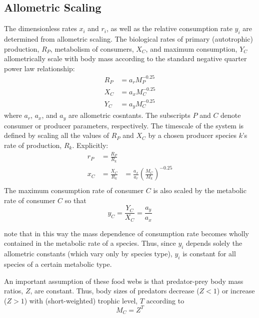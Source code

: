 \documentclass[11pt]{amsart}
\begin{document}
\subsection{Allometric Scaling}
The dimensionless rates $x_i$ and $r_i$, as well as the relative consumption rate $y_i$ are determined from allometric scaling.  The biological rates of primary (autotrophic) production, $R_P$, metabolism of consumers, $X_C$, and maximum consumption, $Y_C$ allometrically scale with body mass according to the standard negative quarter power law relationship:
\begin{align*}
R_P &= a_rM_P^{-0.25}\\
X_C &= a_xM_C^{-0.25}\\
Y_C &= a_yM_C^{-0.25}
\end{align*}
where $a_r$, $a_x$, and $a_y$ are allometric cosntants.  The subscripts $P$ and $C$ denote consumer or producer parameters, respectively.  The timescale of the system is defined by scaling all the values of $R_P$ and $X_C$ by a chosen producer species $k$'s rate of production, $R_k$.  Explicitly:
\begin{align*}
r_P &= \frac{R_P}{R_k}&\\
x_C &= \frac{X_C}{R_k} &= \frac{a_x}{a_r}\left(\frac{M_C}{M_k}\right)^{-0.25}\\
\end{align*}
The maximum consumption rate of consumer $C$ is also scaled by the metabolic rate of consumer $C$ so that
\[
y_C = \frac{Y_C}{X_C} =\frac{a_y}{a_x}
\]

note that in this way the mass dependence of consumption rate becomes wholly contained in the metabolic rate of a species.  Thus, since $y_i$ depends solely the allometric constants (which vary only by species type), $y_i$ is constant for all species of a certain metabolic type.

An important assumption of these food webs is that predator-prey body mass ratios, $Z$, are constant.  Thus, body sizes of predators decrease ($Z<1$) or increase ($Z>1$) with (short-weighted) trophic level, $T$ according to
\[
M_C = Z^T
\]
\end{document}
